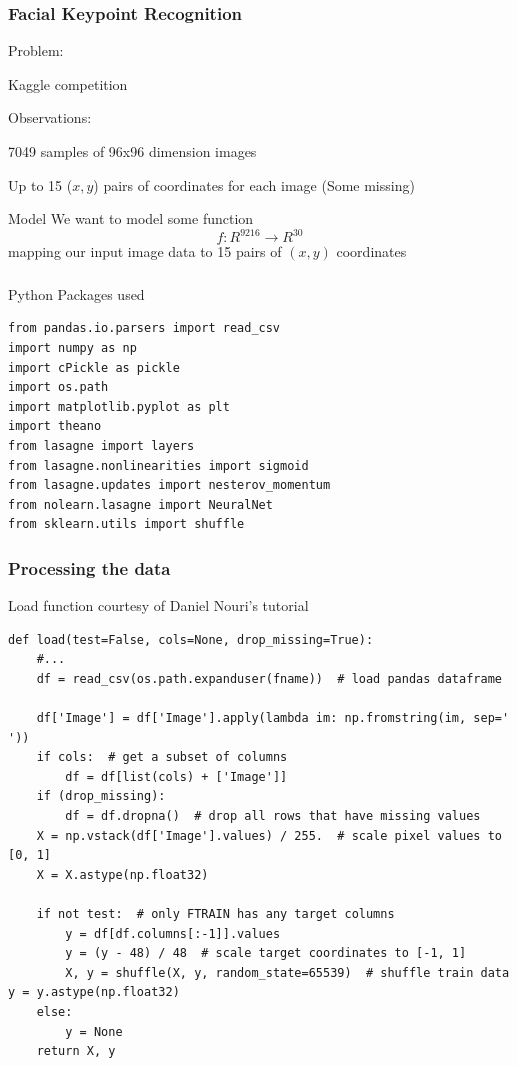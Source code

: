 \documentclass{beamer}
\begin{document}
\begin{frame}
    \frametitle{Facial Keypoint Recognition}
    \begin{block}{Problem:}
    \item Kaggle competition
    \end{block}
    \begin{block}{Observations:}
    \item 7049 samples of 96x96 dimension images
    \item Up to 15 ($x,y$) pairs of coordinates for each image (Some missing)
    \end{block}
    \begin{block}{Model} We want to model some function $$f : R^{9216} \rightarrow R^{30}$$
    mapping our input image data to 15 pairs of $(x,y)$ coordinates 
    \end{block}
\end{frame}

\begin{frame}[fragile]
\frametitle{}
\begin{block}{Python Packages used}
\begin{verbatim}
from pandas.io.parsers import read_csv
import numpy as np
import cPickle as pickle
import os.path
import matplotlib.pyplot as plt
import theano
from lasagne import layers
from lasagne.nonlinearities import sigmoid
from lasagne.updates import nesterov_momentum
from nolearn.lasagne import NeuralNet
from sklearn.utils import shuffle

\end{verbatim}
\end{block}
\end{frame}

\begin{frame}[fragile]
\frametitle{Processing the data}
\begin{block}{Load function courtesy of Daniel Nouri's tutorial}
\begin{verbatim}
def load(test=False, cols=None, drop_missing=True):
    #...
    df = read_csv(os.path.expanduser(fname))  # load pandas dataframe

    df['Image'] = df['Image'].apply(lambda im: np.fromstring(im, sep=' '))
    if cols:  # get a subset of columns
        df = df[list(cols) + ['Image']]
    if (drop_missing):
        df = df.dropna()  # drop all rows that have missing values
    X = np.vstack(df['Image'].values) / 255.  # scale pixel values to [0, 1]
    X = X.astype(np.float32)

    if not test:  # only FTRAIN has any target columns
        y = df[df.columns[:-1]].values
        y = (y - 48) / 48  # scale target coordinates to [-1, 1]
        X, y = shuffle(X, y, random_state=65539)  # shuffle train data          y = y.astype(np.float32)
    else:
        y = None
    return X, y\end{verbatim}
\end{block}
\end{frame}
\end{document}
